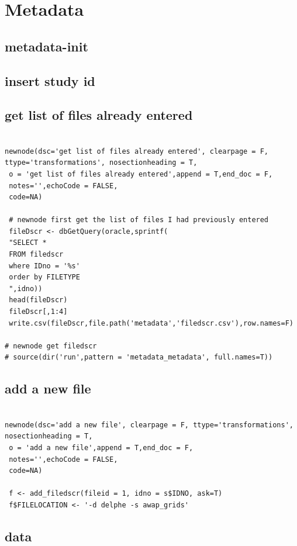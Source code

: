 \documentclass[a4paper]{article}
\begin{document}
\section{Metadata}
\label{sec-10}
\subsection{metadata-init}
\label{sec-10-1}
\subsection{insert study id}
\label{sec-10-2}
\subsection{get list of files already entered}
\label{sec-10-3}


\begin{verbatim}

newnode(dsc='get list of files already entered', clearpage = F, ttype='transformations', nosectionheading = T,
 o = 'get list of files already entered',append = T,end_doc = F,
 notes='',echoCode = FALSE,
 code=NA)

 # newnode first get the list of files I had previously entered
 fileDscr <- dbGetQuery(oracle,sprintf(
 "SELECT * 
 FROM filedscr 
 where IDno = '%s' 
 order by FILETYPE
 ",idno))
 head(fileDscr)
 fileDscr[,1:4]
 write.csv(fileDscr,file.path('metadata','filedscr.csv'),row.names=F) 

# newnode get filedscr
# source(dir('run',pattern = 'metadata_metadata', full.names=T))
\end{verbatim}
\subsection{add a new file}
\label{sec-10-4}


\begin{verbatim}

newnode(dsc='add a new file', clearpage = F, ttype='transformations', nosectionheading = T,
 o = 'add a new file',append = T,end_doc = F,
 notes='',echoCode = FALSE,
 code=NA)

 f <- add_filedscr(fileid = 1, idno = s$IDNO, ask=T)
 f$FILELOCATION <- '-d delphe -s awap_grids'
\end{verbatim}
\subsection{data}
\label{sec-10-5}
\end{document}
